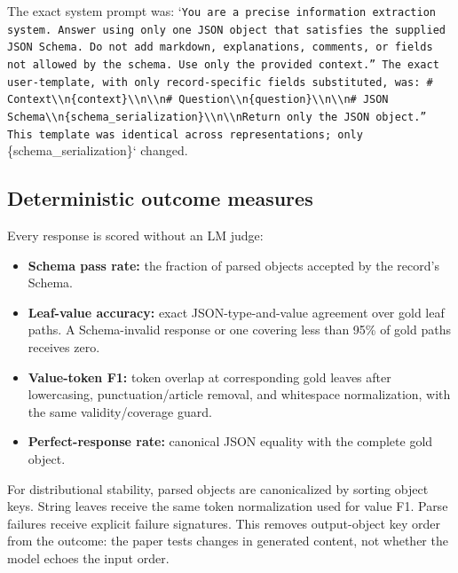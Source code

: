\documentclass[11pt,a4paper]{article}
\begin{document}
The exact system prompt was: `\texttt{You are \allowbreak{}a precis\allowbreak{}e inform\allowbreak{}ation ex\allowbreak{}traction\allowbreak{} system.\allowbreak{} Answer \allowbreak{}using on\allowbreak{}ly one J\allowbreak{}SON obje\allowbreak{}ct that \allowbreak{}satisfie\allowbreak{}s the su\allowbreak{}pplied J\allowbreak{}SON Sche\allowbreak{}ma. Do n\allowbreak{}ot add m\allowbreak{}arkdown,\allowbreak{} explana\allowbreak{}tions, c\allowbreak{}omments,\allowbreak{} or fiel\allowbreak{}ds not a\allowbreak{}llowed b\allowbreak{}y the sc\allowbreak{}hema. Us\allowbreak{}e only t\allowbreak{}he provi\allowbreak{}ded cont\allowbreak{}ext.'' T\allowbreak{}he exact\allowbreak{} user-te\allowbreak{}mplate, \allowbreak{}with onl\allowbreak{}y record\allowbreak{}-specifi\allowbreak{}c fields\allowbreak{} substit\allowbreak{}uted, wa\allowbreak{}s: }\texttt{\# Contex\allowbreak{}t\textbackslash{}\textbackslash{}n\{con\allowbreak{}text\}\textbackslash{}\textbackslash{}n\allowbreak{}\textbackslash{}\textbackslash{}n\# Que\allowbreak{}stion\textbackslash{}\textbackslash{}n\allowbreak{}\{questio\allowbreak{}n\}\textbackslash{}\textbackslash{}n\textbackslash{}\textbackslash{}n\allowbreak{}\# JSON S\allowbreak{}chema\textbackslash{}\textbackslash{}n\allowbreak{}\{schema\_\allowbreak{}serializ\allowbreak{}ation\}\textbackslash{}\textbackslash{}\allowbreak{}n\textbackslash{}\textbackslash{}nRetu\allowbreak{}rn only \allowbreak{}the JSON\allowbreak{} object.\allowbreak{}'' This \allowbreak{}template\allowbreak{} was ide\allowbreak{}ntical a\allowbreak{}cross re\allowbreak{}presenta\allowbreak{}tions; o\allowbreak{}nly }\{schema\_serialization\}` changed.

\subsection{Deterministic outcome measures}
Every response is scored without an LM judge:

\begin{itemize}
\item \textbf{Schema pass rate:} the fraction of parsed objects accepted by the record's Schema.
\item \textbf{Leaf-value accuracy:} exact JSON-type-and-value agreement over gold leaf paths. A Schema-invalid response or one covering less than 95\% of gold paths receives zero.
\item \textbf{Value-token F1:} token overlap at corresponding gold leaves after lowercasing, punctuation/article removal, and whitespace normalization, with the same validity/coverage guard.
\item \textbf{Perfect-response rate:} canonical JSON equality with the complete gold object.
\end{itemize}
For distributional stability, parsed objects are canonicalized by sorting object keys. String leaves receive the same token normalization used for value F1. Parse failures receive explicit failure signatures. This removes output-object key order from the outcome: the paper tests changes in generated content, not whether the model echoes the input order.
\end{document}
